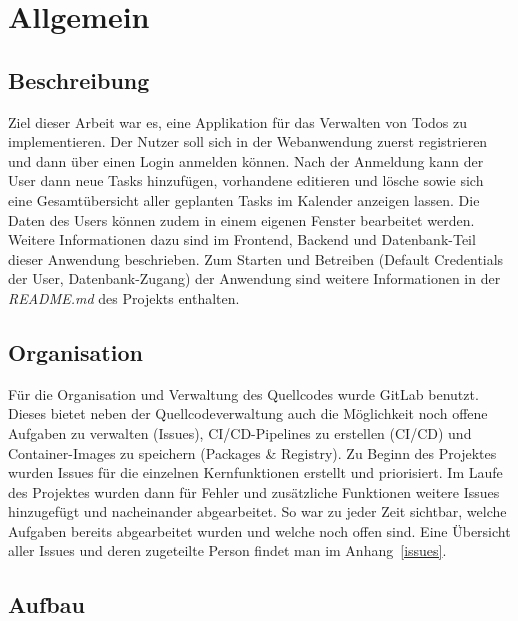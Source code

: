 \documentclass[a4paper, 12pt]{article}
\begin{document}
\newpage
    \section{Allgemein}
    \subsection{Beschreibung}
    Ziel dieser Arbeit war es, eine Applikation für das Verwalten von Todos zu implementieren. Der Nutzer soll sich in der Webanwendung zuerst 
    registrieren und dann über einen Login anmelden können. Nach der Anmeldung kann der User dann neue Tasks hinzufügen, vorhandene editieren
    und lösche sowie sich eine Gesamtübersicht aller geplanten Tasks im Kalender anzeigen lassen. Die Daten des Users können zudem
    in einem eigenen Fenster bearbeitet werden. Weitere Informationen dazu sind im Frontend, Backend und Datenbank-Teil dieser Anwendung
    beschrieben. Zum Starten und Betreiben (Default Credentials der User, Datenbank-Zugang) der Anwendung sind weitere Informationen in der {\it README.md} 
    des Projekts enthalten.

    \subsection{Organisation}
    Für die Organisation und Verwaltung des Quellcodes wurde GitLab benutzt. Dieses bietet neben der Quellcodeverwaltung auch die 
    Möglichkeit noch offene Aufgaben zu verwalten (Issues), CI/CD-Pipelines zu erstellen (CI/CD) und Container-Images zu speichern (Packages \& Registry).
    Zu Beginn des Projektes wurden Issues für die einzelnen Kernfunktionen erstellt und priorisiert. 
    Im Laufe des Projektes wurden dann für Fehler und zusätzliche Funktionen weitere Issues hinzugefügt und nacheinander abgearbeitet.
    So war zu jeder Zeit sichtbar, welche Aufgaben bereits abgearbeitet wurden und welche noch offen sind. 
    Eine Übersicht aller Issues und deren zugeteilte Person findet man im Anhang~\ref{issues}.

    \subsection{Aufbau}
\end{document}
